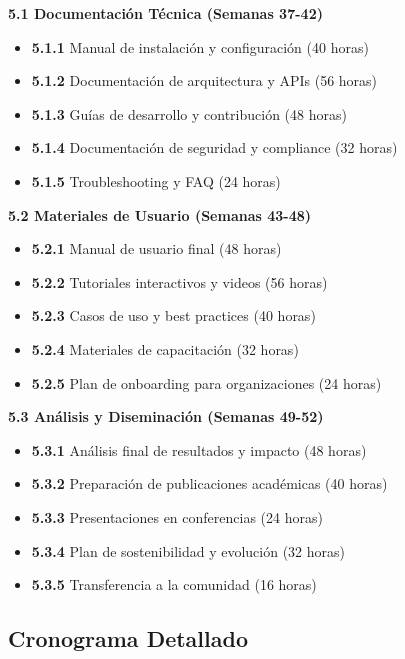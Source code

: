 \textbf{5.1 Documentación Técnica (Semanas 37-42)}
\begin{itemize}
    \item \textbf{5.1.1} Manual de instalación y configuración (40 horas)
    \item \textbf{5.1.2} Documentación de arquitectura y APIs (56 horas)
    \item \textbf{5.1.3} Guías de desarrollo y contribución (48 horas)
    \item \textbf{5.1.4} Documentación de seguridad y compliance (32 horas)
    \item \textbf{5.1.5} Troubleshooting y FAQ (24 horas)
\end{itemize}

\textbf{5.2 Materiales de Usuario (Semanas 43-48)}
\begin{itemize}
    \item \textbf{5.2.1} Manual de usuario final (48 horas)
    \item \textbf{5.2.2} Tutoriales interactivos y videos (56 horas)
    \item \textbf{5.2.3} Casos de uso y best practices (40 horas)
    \item \textbf{5.2.4} Materiales de capacitación (32 horas)
    \item \textbf{5.2.5} Plan de onboarding para organizaciones (24 horas)
\end{itemize}

\textbf{5.3 Análisis y Diseminación (Semanas 49-52)}
\begin{itemize}
    \item \textbf{5.3.1} Análisis final de resultados y impacto (48 horas)
    \item \textbf{5.3.2} Preparación de publicaciones académicas (40 horas)
    \item \textbf{5.3.3} Presentaciones en conferencias (24 horas)
    \item \textbf{5.3.4} Plan de sostenibilidad y evolución (32 horas)
    \item \textbf{5.3.5} Transferencia a la comunidad (16 horas)
\end{itemize}

\subsection{Cronograma Detallado}

